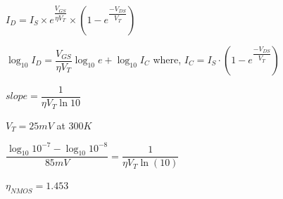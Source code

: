 \documentclass[journal, onecolumn]{IEEEtran} %
\begin{document}
\begin{enumerate}[2.]
{			$I_{D} = I_{S} \times e^{\dfrac{V_{GS}}{\eta V_{T}}} \times (1 - e^{\dfrac{-V_{DS}}{V_{T}}})$
			\vspace{1cm}

			$\log_{10}{I_{D}} =  \dfrac{V_{GS}}{\eta V_{T}}  \log_{10}{e} + \log_{10}{I_C}$ where, $I_C = I_S \cdot (1 - e^{\dfrac{-V_{DS}}{V_{T}}})$

			\vspace{1cm}

			$slope = \dfrac{1}{\eta V_T \ln{10}}$

			\vspace{1cm}

			$V_T = 25mV$ at $300K $

			\vspace{1cm}

			$ \dfrac{\log_{10}{10^{-7}} - \log_{10}{10^{-8}}}{85mV} = \dfrac{1}{\eta V_T \ln(10)}$

			\vspace{1cm}
			$\eta_{NMOS} = 1.453$


}
\end{enumerate}
\end{document}
